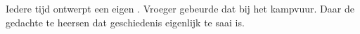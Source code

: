 \documentclass[12pt]{article}
\begin{document}
Iedere tijd ontwerpt een eigen .
Vroeger gebeurde dat bij het kampvuur. Daar  de gedachte
te heersen dat geschiedenis eigenlijk te saai is.
\end{document}
